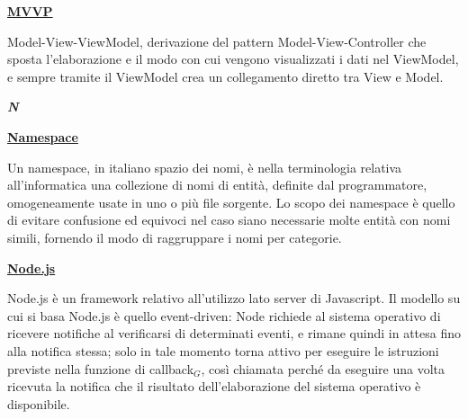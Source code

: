 \bigskip
\begin{addmargin}[0em]{0em}	
	\textbf{\underline{MVVP}} 
\end{addmargin}

\medskip
\begin{addmargin}[5em]{1em}
Model-View-ViewModel, derivazione del pattern Model-View-Controller che sposta l'elaborazione e il modo con cui vengono visualizzati i dati nel ViewModel, e sempre tramite il ViewModel crea un collegamento diretto tra View e Model.
\end{addmargin}	

\newpage

\cleardoublepage
{}
{}
\noindent\hrulefill\hspace{4mm}\textbf{\textsl{\Huge{N}}}\hspace{4mm}\hrulefill

\vspace*{2\bigskipamount}

\begin{addmargin}[0em]{0em}	
	\textbf{\underline{Namespace}} 
\end{addmargin}

\medskip
\begin{addmargin}[5em]{1em}
	Un namespace, in italiano spazio dei nomi, è nella terminologia relativa all'informatica una collezione di nomi di entità, definite dal programmatore, omogeneamente usate in uno o più file sorgente. Lo scopo dei namespace è quello di evitare confusione ed equivoci nel caso siano necessarie molte entità con nomi simili, fornendo il modo di raggruppare i nomi per categorie.
\end{addmargin}	

\bigskip

\begin{addmargin}[0em]{0em}	
	\textbf{\underline{Node.js}} 
\end{addmargin}

\medskip
\begin{addmargin}[5em]{1em}	
Node.js è un framework relativo all'utilizzo lato server di Javascript. Il modello su cui si basa Node.js è quello event-driven: Node richiede al sistema operativo di ricevere notifiche al verificarsi di determinati eventi, e rimane quindi in attesa fino alla notifica stessa; solo in tale momento torna attivo per eseguire le istruzioni previste nella funzione di callback$_G$, così chiamata perché da eseguire una volta ricevuta la notifica che il risultato dell'elaborazione del sistema operativo è disponibile. 
\end{addmargin}	

